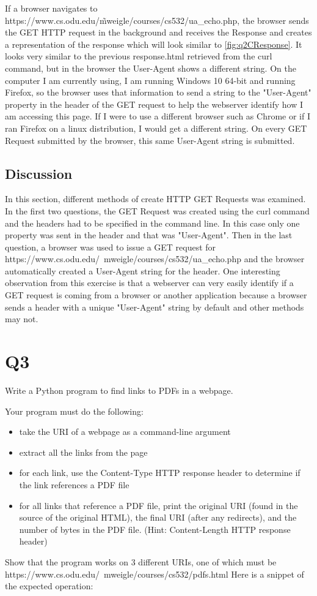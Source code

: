 \documentclass[12pt]{article}
\begin{document}
If a browser navigates to https://www.cs.odu.edu/\~mweigle/courses/cs532/ua\_echo.php, the browser sends the GET HTTP request in the background and receives the Response and creates a representation of
 the response which will look similar to \ref{fig:q2CResponse}. It looks very similar to the previous response.html retrieved from the curl command, but in the browser the User-Agent shows a different string. On
the computer I am currently using, I am running Windows 10 64-bit and running Firefox, so the browser uses that information to send a string to the "User-Agent" property in the header of the GET request to help the webserver identify
how I am accessing this page. If I were to use a different browser such as Chrome or if I ran Firefox on a linux distribution, I would get a different string. On every GET Request submitted by the browser, this same
User-Agent string is submitted.

\subsection*{Discussion}
In this section, different methods of create HTTP GET Requests was examined. In the first two questions, the GET Request was created using the curl command and the headers had to be specified in the command line. In this case only one property was sent in the header and that was "User-Agent".  Then in the last question, a browser was used to issue a GET request for https://www.cs.odu.edu/~mweigle/courses/cs532/ua\_echo.php and the browser automatically created a User-Agent string for the header. One interesting observation from this exercise is that a webserver can very easily identify if a GET request is coming from a browser or another application because a browser sends a header with a unique "User-Agent" string by default and other methods may not. 
\pagebreak
\section*{Q3}
Write a Python program to find links to PDFs in a webpage.

Your program must do the following:
\begin{itemize}
    \item take the URI of a webpage as a command-line argument
    \item extract all the links from the page
    \item for each link, use the Content-Type HTTP response header to determine if the link references a PDF file
    \item for all links that reference a PDF file, print the original URI (found in the source of the original HTML), the final URI (after any redirects), and the number of bytes in the PDF file. (Hint: Content-Length HTTP response header)
\end{itemize}
Show that the program works on 3 different URIs, one of which must be https://www.cs.odu.edu/~mweigle/courses/cs532/pdfs.html
Here is a snippet of the expected operation:
\end{document}
